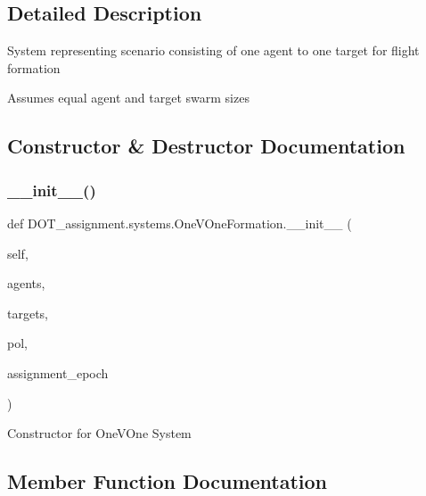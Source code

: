 \subsection{Detailed Description}
\begin{DoxyVerb}System representing scenario consisting of one agent to one target for flight formation

Assumes equal agent and target swarm sizes\end{DoxyVerb}
 

\subsection{Constructor \& Destructor Documentation}
\mbox{\label{class_d_o_t__assignment_1_1systems_1_1_one_v_one_formation_add4134e8f088317b97110a33ab132e00}} 
\subsubsection{\texorpdfstring{\_\_init\_\_()}{\_\_init\_\_()}}
{\footnotesize\ttfamily def D\+O\+T\+\_\+assignment.\+systems.\+One\+V\+One\+Formation.\+\_\+\+\_\+init\+\_\+\+\_\+ (\begin{DoxyParamCaption}\item[{}]{self,  }\item[{}]{agents,  }\item[{}]{targets,  }\item[{}]{pol,  }\item[{}]{assignment\+\_\+epoch }\end{DoxyParamCaption})}

\begin{DoxyVerb}Constructor for OneVOne System
\end{DoxyVerb}
 

\subsection{Member Function Documentation}
\mbox{\label{class_d_o_t__assignment_1_1systems_1_1_one_v_one_formation_a296aed699e0baaa350ffd516b6f1d9c5}} 
